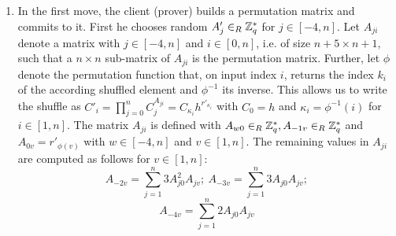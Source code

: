 \begin{enumerate}
  \item In the first move, the client (prover) builds a permutation matrix and commits to it.
  First he chooses random $A'_j\in_R\mathbb{Z}^\ast_q$ for $j\in[-4,n]$.
Let $A_{ji}$ denote a matrix with $j\in[-4,n]$ and $i\in[0,n]$, i.e. of size $n+5\times n+1$, such that a $n\times n$ sub-matrix of $A_{ji}$ is the permutation matrix.
Further, let $\phi$ denote the permutation function that, on input index $i$, returns the index $k_i$ of the according shuffled element and $\phi^{-1}$ its inverse.
This allows us to write the shuffle as $C'_{i}=\prod_{j=0}^{n}C_{j}^{A_{ji}}=C_{\kappa_i}h^{r'_{\kappa_i}}$ with $C_0=h$ and $\kappa_i=\phi^{-1}(i)$ for $i\in[1,n]$.
The matrix $A_{ji}$ is defined with $A_{w0}\in_R\mathbb{Z}^\ast_q, A_{-1v}\in_R\mathbb{Z}^\ast_q$ and $A_{0v}=r'_{\phi(v)}$ with $w\in[-4,n]$ and $v\in[1,n]$. %
The remaining values in $A_{ji}$ are computed as follows for $v\in[1,n]$:
\[ 
  A_{-2v}=\sum_{j=1}^{n} 3A_{j0}^2 A_{jv};~ A_{-3v}=\sum_{j=1}^{n} 3A_{j0} A_{jv};
\]
\[
  A_{-4v}=\sum_{j=1}^{n} 2A_{j0} A_{jv}
\]



\end{enumerate}
